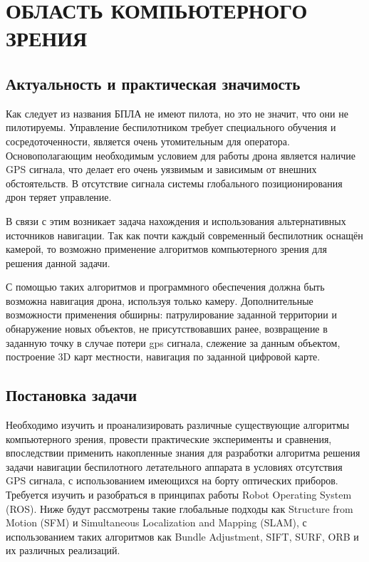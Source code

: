 \chapter{ОБЛАСТЬ КОМПЬЮТЕРНОГО ЗРЕНИЯ}

\section{Актуальность и практическая значимость}

Как следует из названия БПЛА не имеют пилота, но это не значит, что они не пилотируемы. Управление беспилотником требует специального обучения и сосредоточенности, является очень утомительным для оператора. Основополагающим необходимым условием для работы дрона является наличие GPS сигнала, что делает его очень уязвимым и зависимым от внешних обстоятельств. В отсутствие сигнала системы глобального позиционирования дрон теряет управление.

В связи с этим возникает задача нахождения и использования альтернативных источников навигации. Так как почти каждый современный беспилотник оснащён камерой, то возможно применение алгоритмов компьютерного зрения для решения данной задачи.

С помощью таких алгоритмов и программного обеспечения должна быть возможна навигация дрона, используя только камеру. Дополнительные возможности применения обширны: патрулирование заданной территории и обнаружение новых объектов, не присутствовавших ранее, возвращение в заданную точку в случае потери gps сигнала, слежение за данным объектом, построение 3D карт местности, навигация по заданной цифровой карте.

\section{Постановка задачи}

Необходимо изучить и проанализировать различные существующие алгоритмы компьютерного зрения, провести практические эксперименты и сравнения, впоследствии применить накопленные знания для разработки алгоритма решения задачи навигации беспилотного летательного аппарата в условиях отсутствия GPS сигнала, с использованием имеющихся на борту оптических приборов. Требуется изучить и разобраться в принципах работы Robot Operating System (ROS). Ниже будут рассмотрены такие глобальные подходы как Structure from Motion (SFM) и Simultaneous Localization and Mapping (SLAM), с использованием таких алгоритмов как Bundle Adjustment, SIFT, SURF, ORB и их различных реализаций.


